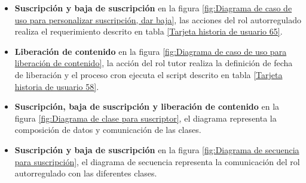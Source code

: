 \begin{itemize}

\item \textbf{Suscripción y baja de suscripción}
en la figura \ref{fig:Diagrama de caso de uso para personalizar suscripción, dar baja},
las acciones del rol autorregulado realiza el requerimiento descrito en tabla
\ref{Tarjeta historia de usuario 65}.

\begin{minipage}{1.0\textwidth}
	\centering
	\label{fig:Diagrama de caso de uso para personalizar suscripción, dar baja}
\end{minipage}

\item \textbf{Liberación de contenido} en la figura 
\ref{fig:Diagrama de caso de uso para liberación de contenido}, la acción del
rol tutor realiza la definición de fecha de liberación y el proceso cron
ejecuta el script descrito en tabla \ref{Tarjeta historia de usuario 58}.

\begin{minipage}{1.0\textwidth}
	\centering
	\label{fig:Diagrama de caso de uso para liberación de contenido}
\end{minipage}

\item \textbf{Suscripción, baja de suscripción y liberación de contenido}
en la figura \ref{fig:Diagrama de clase para suscriptor}, el diagrama
representa la composición de datos y comunicación de las clases.

\begin{minipage}{1.0\textwidth}
	\centering
	\label{fig:Diagrama de clase para suscriptor}
\end{minipage}

\item \textbf{Suscripción y baja de suscripción}
en la figura \ref{fig:Diagrama de secuencia para suscripción}, el diagrama
de secuencia representa la comunicación del rol autorregulado con las
diferentes clases.


\end{itemize}
